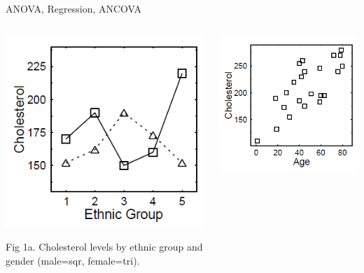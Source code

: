 \documentclass[presentation]{beamer}
\begin{document}
\begin{frame}[label={sec:org5caa19b}]{ANOVA, Regression, ANCOVA}
\begin{columns}
\begin{column}[t]{.33\columnwidth}
\includegraphics[width=.9\linewidth]{08_glm_img/CholesterolByEthnic.png}

\begin{center}\begin{scriptsize}
Fig 1a.  Cholesterol levels by ethnic group and gender (male=sqr, female=tri).
\end{scriptsize}\end{center}
\end{column}

\begin{column}[t]{.33\columnwidth}
\includegraphics[width=.9\linewidth]{08_glm_img/CholesterolByAge.png}


\end{column}
\end{columns}
\end{frame}
\end{document}
